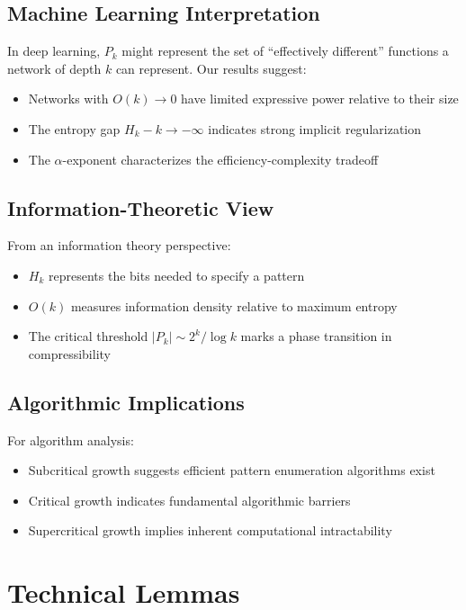 \documentclass[11pt]{article}
\theoremstyle{definition}
\begin{document}
\subsection{Machine Learning Interpretation}

In deep learning, $P_k$ might represent the set of ``effectively different'' functions a network of depth $k$ can represent. Our results suggest:
\begin{itemize}
\item Networks with $O(k)\to 0$ have limited expressive power relative to their size
\item The entropy gap $H_k-k\to-\infty$ indicates strong implicit regularization
\item The $\alpha$-exponent characterizes the efficiency-complexity tradeoff
\end{itemize}

\subsection{Information-Theoretic View}

From an information theory perspective:
\begin{itemize}
\item $H_k$ represents the bits needed to specify a pattern
\item $O(k)$ measures information density relative to maximum entropy
\item The critical threshold $|P_k|\sim 2^k/\log k$ marks a phase transition in compressibility
\end{itemize}

\subsection{Algorithmic Implications}

For algorithm analysis:
\begin{itemize}
\item Subcritical growth suggests efficient pattern enumeration algorithms exist
\item Critical growth indicates fundamental algorithmic barriers
\item Supercritical growth implies inherent computational intractability
\end{itemize}

\section{Technical Lemmas}
\end{document}
